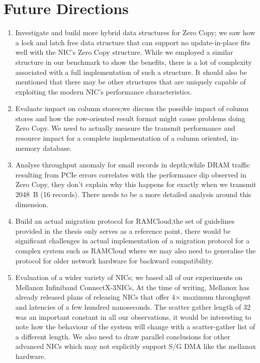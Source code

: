 \section{Future Directions}

\begin{enumerate}
\item Investigate and build more hybrid data structures for Zero Copy; we saw how a lock and latch free data structure that can support no update-in-place 
fits well with the NIC's Zero Copy structure. While we employed a similar structure in our benchmark to show the benefits, there is a lot of complexity associated 
with a full implementation of such a structure. It should also be mentioned that there may be other structures that are uniquely capable of exploiting the modern NIC's 
performance characteristics.
\item Evaluate impact on column stores;we discuss the possible impact of column stores and how the row-oriented result format might cause problems doing Zero Copy. We need 
to actually measure the transmit performance and resource impact for a complete implementation of a column oriented, in-memory database.
\item Analyse throughput anomaly for small records in depth;while DRAM traffic resulting from PCIe errors correlates with the performance dip observed in Zero Copy, 
they don't explain why this happens for exactly when we transmit 2048~B (16 records). There needs to be a more detailed analysis around this dimension.
\item Build an actual migration protocol for RAMCloud;the set of guidelines provided in the thesis only serves as a reference point, there would be significant challenges 
in actual implementation of a migration protocol for a complex system such as RAMCloud where we may also need to generalise the protocol for older network hardware for backward 
compatibility.
\item Evaluation of a wider variety of NICs; we based all of our experiments on Mellanox Infiniband ConnectX-3\textregistered NICs, At the time of writing, Mellanox has already 
released plans of releasing NICs that offer 4$\times$ maximum throughput and latencies of a few hundred nanoseconds. The scatter gather length of 32 was an important constant in 
all our observations, it would be interesting to note how the behaviour of the system will change with a scatter-gather list of a different length. We also need to draw parallel 
conclusions for other advanced NICs which may not explicitly support S/G DMA like the mellanox hardware.
\end{enumerate}
